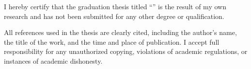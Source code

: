 \noindent\hspace{\parindent}I hereby certify that the graduation thesis titled ``\ThesisTitle''
is the result of my own research and has not been submitted for any other degree or
qualification.

\hspace{\parindent}All references used in the thesis are clearly cited, including the author's
name, the title of the work, and the time and place of publication. I accept full
responsibility for any unauthorized copying, violations of academic regulations, or
instances of academic dishonesty.
